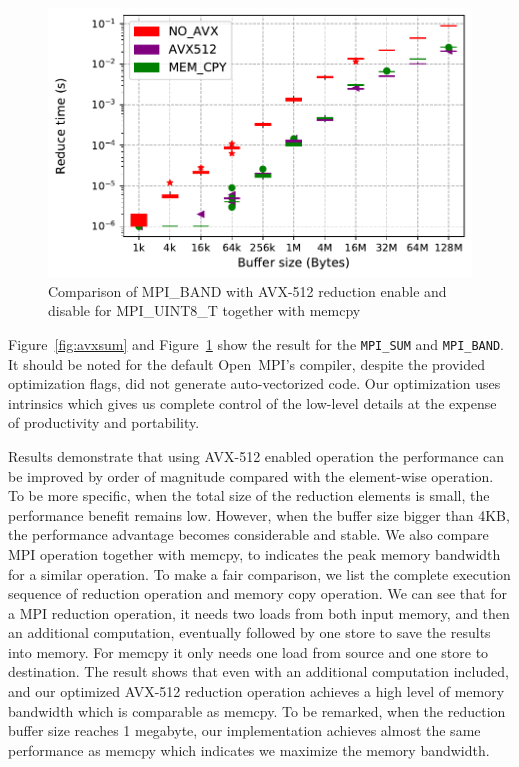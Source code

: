 \documentclass[5p,times,twocolumn]{elsarticle}
\newcommand{\mpifunc}[1]{\lstinline"MPI_#1"\xspace}
\newcommand{\ompi}[0]{Open~MPI\xspace}
\newcommand{\mpi}[0]{\textsc{MPI}\xspace}
\begin{document}
\begin{figure}[h]
    \centering
    \includegraphics[width=\linewidth]{avx_extend_more_prod_u8_1k-128M.pdf}
    \caption{Comparison of MPI\_BAND with AVX-512 reduction enable and disable for MPI\_UINT8\_T together with memcpy}
    \label{fig:avxband}
\end{figure}

Figure~\ref{fig:avxsum} and Figure~\ref{fig:avxband} show the result for the
\mpifunc{SUM} and \mpifunc{BAND}.
It should be noted for the default \ompi's compiler, despite the
provided optimization flags, did not generate auto-vectorized
code. Our optimization uses intrinsics which gives us complete
control of the low-level details at the expense of productivity and
portability.

Results demonstrate that using AVX-512 enabled operation the
performance can be improved by order of magnitude compared with the
element-wise operation.  To be more specific, when the total size of
the reduction elements is small, the performance benefit remains low.
%
However, when the buffer size bigger than 4KB, the performance
advantage becomes considerable and stable.  We also compare MPI
operation together with memcpy, to indicates the peak memory bandwidth
for a similar operation.  To make a fair comparison, we list the
complete execution sequence of reduction operation and memory copy
operation.  We can see that for a \mpi reduction operation, it needs
two loads from both input memory, and then an additional
computation, eventually followed by one store to save the results into
memory. For memcpy it only needs one load from source and one store to
destination.  The result shows that even with an additional
computation included, and our optimized AVX-512 reduction operation
achieves a high level of memory bandwidth which is comparable as
memcpy.  To be remarked, when the reduction buffer size reaches 1
megabyte, our implementation achieves almost the same performance as
memcpy which indicates we maximize the memory bandwidth.
\end{document}
